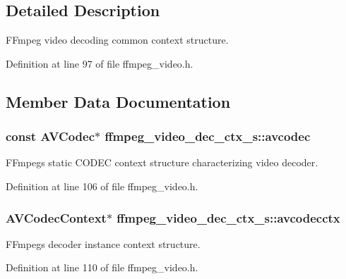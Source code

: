 \subsection{Detailed Description}
F\+Fmpeg video decoding common context structure. 

Definition at line 97 of file ffmpeg\+\_\+video.\+h.



\subsection{Member Data Documentation}
\subsubsection[{\texorpdfstring{avcodec}{avcodec}}]{\setlength{\rightskip}{0pt plus 5cm}const A\+V\+Codec$\ast$ ffmpeg\+\_\+video\+\_\+dec\+\_\+ctx\+\_\+s\+::avcodec}\hypertarget{structffmpeg__video__dec__ctx__s_a98973b6abbd43effdd95f4970939f7e1}{}\label{structffmpeg__video__dec__ctx__s_a98973b6abbd43effdd95f4970939f7e1}
F\+Fmpeg\textquotesingle{}s static C\+O\+D\+EC context structure characterizing video decoder. 

Definition at line 106 of file ffmpeg\+\_\+video.\+h.

\subsubsection[{\texorpdfstring{avcodecctx}{avcodecctx}}]{\setlength{\rightskip}{0pt plus 5cm}A\+V\+Codec\+Context$\ast$ ffmpeg\+\_\+video\+\_\+dec\+\_\+ctx\+\_\+s\+::avcodecctx}\hypertarget{structffmpeg__video__dec__ctx__s_a440f95e9f5ef2f16fa0d70262eec4ca8}{}\label{structffmpeg__video__dec__ctx__s_a440f95e9f5ef2f16fa0d70262eec4ca8}
F\+Fmpeg\textquotesingle{}s decoder instance context structure. 

Definition at line 110 of file ffmpeg\+\_\+video.\+h.

